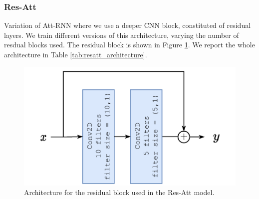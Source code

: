 \subsubsection{\textbf{Res-Att}}
Variation of Att-RNN where we use a deeper CNN block, constituted of residual layers.  We train different versions of this architecture, varying the number of resdual blocks used. The residual block is shown in Figure \ref{fig:resblock}. We report the whole architecture in Table \ref{tab:resatt_architecture}. 

\begin{figure}
	\centering
	\includegraphics[width=0.9\linewidth]{imgs/residual_block.pdf}

	\caption{Architecture for the residual block used in the Res-Att model.}
		\label{fig:resblock}
\end{figure}

\begin{table}[h!]
	\centering
	\caption{Res-Att$k$ architecture, where $k$ is the number of residual blocks.}
	\label{tab:resatt_architecture}
\end{table}


